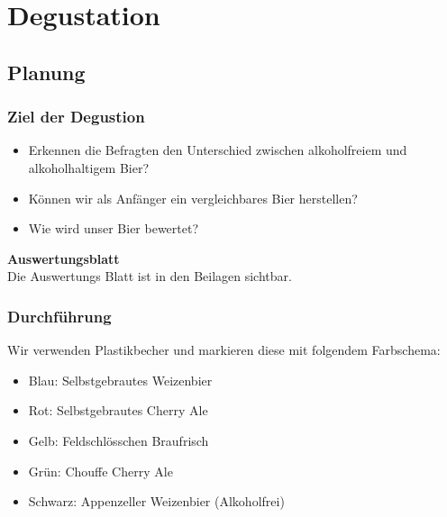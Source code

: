 \newpage
\section{Degustation}
\subsection{Planung}
\subsubsection{Ziel der Degustion}
\begin{itemize}
    \item Erkennen die Befragten den Unterschied zwischen alkoholfreiem und alkoholhaltigem Bier?
    \item Können wir als Anfänger ein vergleichbares Bier herstellen?
    \item Wie wird unser Bier bewertet?
\end{itemize}
\textbf{Auswertungsblatt}\\
Die Auswertungs Blatt ist in den Beilagen sichtbar.
\subsubsection{Durchführung}
Wir verwenden Plastikbecher und markieren diese mit folgendem Farbschema:
\begin{itemize}
    \item Blau: 	Selbstgebrautes Weizenbier
    \item Rot:		Selbstgebrautes Cherry Ale
    \item Gelb: 	Feldschlösschen Braufrisch \cite{brack}
    \item Grün:		Chouffe Cherry Ale \cite{Manor}
    \item Schwarz:	Appenzeller Weizenbier (Alkoholfrei) \cite{Coop}
\end{itemize}
